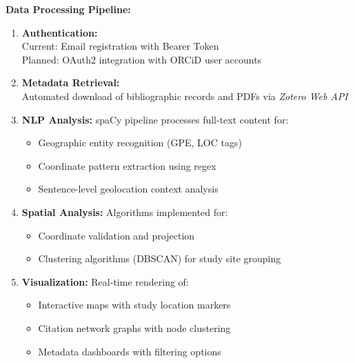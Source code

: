 \documentclass[a0,portrait]{a0poster}
\begin{document}
\begin{multicols}{3}
	\begin{tcolorbox}[mainbox, title={\Large\textbf{Implementation Workflow}}]
		\vspace{0.5cm}
		\textbf{Data Processing Pipeline:}
		\vspace{0.5cm}
		\begin{enumerate}[leftmargin=*]
			\item \textbf{Authentication:} \\ Current: Email registration with Bearer Token\\ Planned: OAuth2 integration with ORCiD user accounts
			\item \textbf{Metadata Retrieval:} \\ Automated download of bibliographic records and PDFs via \emph{Zotero Web API}
			\item \textbf{NLP Analysis:} spaCy pipeline processes full-text content for:
			      \begin{itemize}
				      \item Geographic entity recognition (GPE, LOC tags)
				      \item Coordinate pattern extraction using regex
				      \item Sentence-level geolocation context analysis
			      \end{itemize}
			\item \textbf{Spatial Analysis:} Algorithms implemented for:
			      \begin{itemize}
				      \item Coordinate validation and projection
				      \item Clustering algorithms (DBSCAN) for study site grouping
			      \end{itemize}
			\item \textbf{Visualization:} Real-time rendering of:
			      \begin{itemize}
				      \item Interactive maps with study location markers
				      \item Citation network graphs with node clustering
				      \item Metadata dashboards with filtering options
			      \end{itemize}
		\end{enumerate}
		\vspace{0.5cm}
	\end{tcolorbox}

	\vspace{0.5cm}


\end{multicols}
\end{document}
